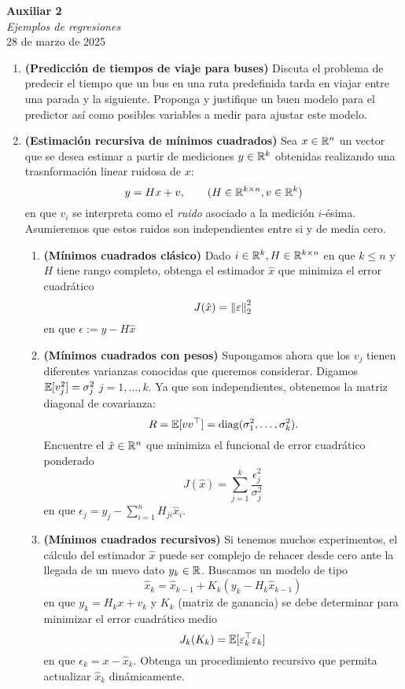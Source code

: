 \documentclass{article}
\begin{document}


\begin{center}
    \Huge{\textbf{Auxiliar 2}}\\
\textit{\large{Ejemplos de regresiones}}\\
    \normalsize
	28 de marzo de 2025
\end{center}

\begin{enumerate}
	\item \textbf{(Predicción de tiempos de viaje para buses)} Discuta el problema de predecir el tiempo que un bus en una ruta predefinida tarda en viajar entre una parada y la siguiente. Proponga y justifique un buen modelo para el predictor así como posibles variables a medir para ajustar este modelo.

	\item \textbf{(Estimación recursiva de mínimos cuadrados)} Sea \(x \in \mathbb{R}^n\) un vector que se desea estimar a partir de mediciones \(y \in \mathbb{R}^k\) obtenidas realizando una trasnformación linear ruidosa de \(x\):
		\[y = Hx + v, \qquad (H \in \mathbb{R}^{k \times n},v \in \mathbb{R}^k)\]
		en que \(v_i\) se interpreta como el \textit{ruido} asociado a la medición \(i\)-ésima. Asumieremos que estos ruidos son independientes entre si y de media cero.
		\begin{enumerate}
			\item \textbf{(Mínimos cuadrados clásico)} Dado \(i \in \mathbb{R}^k, H \in \mathbb{R}^{k \times n}\) en que \(k \leq n\) y \(H\) tiene rango completo, obtenga el estimador \(\hat{x}\) que minimiza el error cuadrático
				\[J(\hat{x}) = \norm{\varepsilon}_2^2\]
				en que \(\epsilon := y - H\hat{x}\)
			\item \textbf{(Mínimos cuadrados con pesos)} Supongamos ahora que los \(v_j\) tienen diferentes varianzas conocidas que queremos considerar. Digamos \(\mathbb{E}[v_j^2] = \sigma_j^2\) \(j = 1, \dots, k\). Ya que son independientes, obtenemos la matriz diagonal de covarianza:
				\[R = \mathbb{E}[vv^\top] = \operatorname{diag}(\sigma_1^2, \dots, \sigma_k^2).\]
				Encuentre el \(\hat{x} \in \mathbb{R}^n\) que minimiza el funcional de error cuadrático ponderado
				\[J(\hat{x}) = \sum_{j=1}^k \frac{\epsilon_j^2}{\sigma_j^2}\]
				en que \(\epsilon_j = y_j - \sum_{i=1}^n H_{ji} \hat{x}_i\).
			\item \textbf{(Mínimos cuadrados recursivos)} Si tenemos muchos experimentos, el cálculo del estimador \(\hat{x}\) puede ser complejo de rehacer desde cero ante la llegada de un nuevo dato \(y_k \in \mathbb{R}\). Buscamos un modelo de tipo
				\[\hat{x}_k = \hat{x}_{k-1} + K_k (y_k - H_k \hat{x}_{k-1})\]
				en que \(y_k = H_k x + v_k\) y \(K_k\) (matriz de ganancia) se debe determinar para minimizar el error cuadrático medio
				\[J_k(K_k) = \mathbb{E}[\varepsilon_k^\top \varepsilon_k]\]
				en que \(\epsilon_k = x - \hat{x}_k\). Obtenga un procedimiento recursivo que permita actualizar \(\hat{x}_k\) dinámicamente.
		\end{enumerate}
\end{enumerate}
\end{document}
